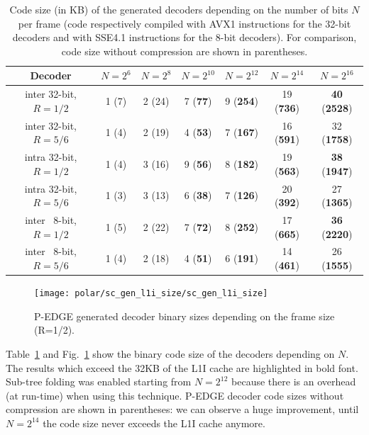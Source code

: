 \begin{table}[h]
  \begin{center}
  \begin{tabular}{ c | c | c | c | c | c | c}
    Decoder                  & $N = 2^6$ & $N = 2^8$   & $N = 2^{10}$     & $N = 2^{12}$     & $N = 2^{14}$      & $N = 2^{16}$                \\
    \hline
    inter 32-bit, $R = 1/2$  & 1 (7)     & 2 (24)      & 7 (\textbf{77})  & 9 (\textbf{254}) & 19 (\textbf{736}) & \textbf{40} (\textbf{2528}) \\
    \hline
    inter 32-bit, $R = 5/6$  & 1 (4)     & 2 (19)      & 4 (\textbf{53})  & 7 (\textbf{167}) & 16 (\textbf{591}) & 32          (\textbf{1758}) \\
    \hline
    intra 32-bit, $R = 1/2$  & 1 (4)     & 3 (16)      & 9 (\textbf{56})  & 8 (\textbf{182}) & 19 (\textbf{563}) & \textbf{38} (\textbf{1947}) \\
    \hline
    intra 32-bit, $R = 5/6$  & 1 (3)     & 3 (13)      & 6 (\textbf{38})  & 7 (\textbf{126}) & 20 (\textbf{392}) & 27          (\textbf{1365}) \\
    \hline
    inter ~8-bit, $R = 1/2$  & 1 (5)     & 2 (22)      & 7 (\textbf{72})  & 8 (\textbf{252}) & 17 (\textbf{665}) & \textbf{36} (\textbf{2220}) \\
    \hline
    inter ~8-bit, $R = 5/6$  & 1 (4)     & 2 (18)      & 4 (\textbf{51})  & 6 (\textbf{191}) & 14 (\textbf{461}) & 26          (\textbf{1555}) \\
  \end{tabular}
  \end{center}
  \caption{Code size (in KB) of the generated decoders depending on the number
    of bits $N$ per frame (code respectively compiled with AVX1 instructions for
    the 32-bit decoders and with SSE4.1 instructions for the 8-bit decoders).
    For comparison, code size without compression are shown in parentheses.}
  \label{tab:polar_sc_gen_l1i_size}
\end{table}

\begin{figure}
  \texttt{[image: polar/sc\_gen\_l1i\_size/sc\_gen\_l1i\_size]}
  \caption{P-EDGE generated decoder binary sizes depending on the frame size
    (R=1/2).}
  \label{plot:polar_sc_gen_l1i_size}
\end{figure}

Table~\ref{tab:polar_sc_gen_l1i_size} and Fig.~\ref{plot:polar_sc_gen_l1i_size}
show the binary code size of the decoders depending on $N$. The results which
exceed the 32KB of the L1I cache are highlighted in bold font. Sub-tree folding
was enabled starting from $N=2^{12}$ because there is an overhead (at run-time)
when using this technique. P-EDGE decoder code sizes without compression are
shown in parentheses: we can observe a huge improvement, until $N=2^{14}$ the
code size never exceeds the L1I cache anymore.


